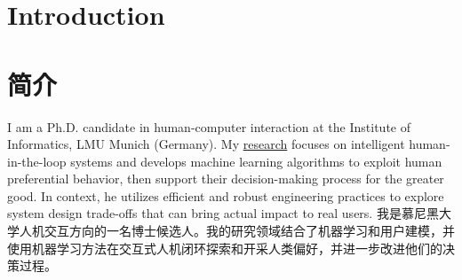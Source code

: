  {
\section{\textbf{Introduction}}
}{
\section{\textbf{简介}}
}
 {
\small
I am a Ph.D. candidate in human-computer interaction at the Institute of Informatics, LMU Munich (Germany). My \href{https://changkun.de/research}{research} focuses on intelligent human-in-the-loop systems and develops machine learning algorithms to exploit human preferential behavior, then support their decision-making process for the greater good. In context, he utilizes efficient and robust engineering practices to explore system design trade-offs that can bring actual impact to real users.
}{
\small
我是慕尼黑大学人机交互方向的一名博士候选人。我的研究领域结合了机器学习和用户建模，并使用机器学习方法在交互式人机闭环探索和开采人类偏好，并进一步改进他们的决策过程。
}
